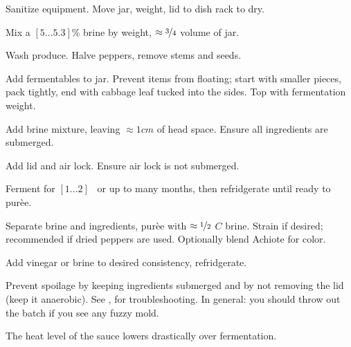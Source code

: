\begin{preparation}
\item Sanitize equipment.
	Move jar, weight, lid to dish rack to dry.

\item Mix a $[5 \dots 5.3]\%$ brine by weight, $\approx\nicefrac{3}{4}$ volume of jar.

\item Wash produce.
	Halve peppers, remove stems and seeds.

\item Add fermentables to jar.
	Prevent items from floating; start with smaller pieces, pack tightly, end with cabbage leaf tucked into the sides.
	Top with fermentation weight.

\item Add brine mixture, leaving $\approx1cm$ of head space.
	Ensure all ingredients are submerged.

\item Add lid and air lock.
	Ensure air lock is not submerged.

\item Ferment for $[1...2]$ \week~or up to many months, then refridgerate until ready to pur\`{e}e.

\item Separate brine and ingredients, pur\`{e}e with $\approx\nicefrac{1}{2}$ $C$ brine.
	Strain if desired; recommended if dried peppers are used.
	Optionally blend Achiote for color.

\item Add vinegar or brine to desired consistency, refridgerate.
\end{preparation}


\begin{experiments}
\item Prevent spoilage by keeping ingredients submerged and by not removing the lid (keep it anaerobic).
	See  \cite{fieryferments2017},
for troubleshooting.
	In general: you should throw out the batch if you see any fuzzy mold.
\item The heat level of the sauce lowers drastically over fermentation.
\end{experiments}


\recipeend
